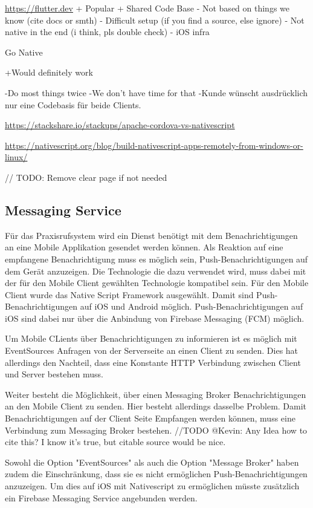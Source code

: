  
 \url{https://flutter.dev}
    + Popular
    + Shared Code Base
    - Not based on things we know (cite docs or smth)
    - Difficult setup (if you find a source, else ignore)
    - Not native in the end (i think, pls double check)
    - iOS infra


Go Native

    +Would definitely work

    -Do most things twice
    -We don't have time for that
    -Kunde wünscht ausdrücklich nur eine Codebasis für beide Clients.

\url{https://stackshare.io/stackups/apache-cordova-vs-nativescript}

\url{https://nativescript.org/blog/build-nativescript-apps-remotely-from-windows-or-linux/ }

// TODO: Remove clear page if not needed
\clearpage

\subsection{Messaging Service}\label{subsec:messaging-eval}

Für das Praxisrufsystem wird ein Dienst benötigt mit dem Benachrichtigungen an eine Mobile Applikation gesendet werden können.
Als Reaktion auf eine empfangene Benachrichtigung muss es möglich sein, Push-Benachrichtigungen auf dem Gerät anzuzeigen.
Die Technologie die dazu verwendet wird, muss dabei mit der für den Mobile Client gewählten Technologie kompatibel sein.
Für den Mobile Client wurde das Native Script Framework ausgewählt.
Damit sind Push-Benachrichtigungen auf iOS und Android möglich.
Push-Benachrichtigungen auf iOS sind dabei nur über die Anbindung von Firebase Messaging (FCM) möglich.\cite{nativescript-push}

Um Mobile CLients über Benachrichtigungen zu informieren ist es möglich mit EventSources\cite{event-source} Anfragen von der Serverseite an einen Client zu senden.
Dies hat allerdings den Nachteil, dass eine Konstante HTTP Verbindung zwischen Client und Server bestehen muss.

Weiter besteht die Möglichkeit, über einen Messaging Broker Benachrichtigungen an den Mobile Client zu senden.
Hier besteht allerdings dasselbe Problem.
Damit Benachrichtigungen auf der Client Seite Empfangen werden können, muss eine Verbindung zum Messaging Broker bestehen. //TODO @Kevin: Any Idea how to cite this? I know it's true, but citable source would be nice.

Sowohl die Option "EventSources" als auch die Option "Message Broker" haben zudem die Einschränkung, dass sie es nicht ermöglichen Push-Benachrichtigungen anzuzeigen.
Um dies auf iOS mit Nativescript zu ermöglichen müsste zusätzlich ein Firebase Messaging Service angebunden werden.

